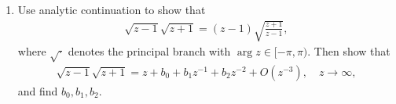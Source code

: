 \documentclass[10pt]{amsart}
\theoremstyle{nonumberplain}
\begin{document}
\begin{enumerate}[label={\bf {\arabic*}:}]
\item Use analytic continuation to show that
  \begin{align*}
    \sqrt{z -1} \sqrt{z + 1} = (z -1) \sqrt{ \frac{ z +1}{z-1}},
  \end{align*}
  where $\sqrt{\cdot}$ denotes the principal branch with $\arg z \in
  [-\pi, \pi)$.  Then show that
  \begin{align*}
    \sqrt{z -1} \sqrt{z + 1} = z + b_0 + b_1 z^{-1} + b_2  z^{-2} +
    O(z^{-3}), \quad z \to \infty,
  \end{align*}
  and find $b_0,b_1,b_2$.
  
\end{enumerate}
\end{document}
